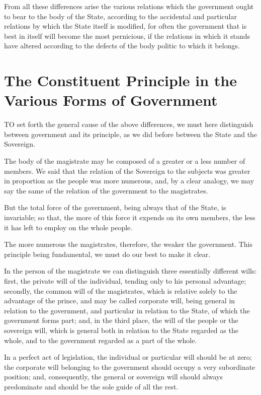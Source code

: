 \documentclass[12pt]{report}
\begin{document}
From all these differences arise the various relations which the government ought to bear to the body of the State, according to the accidental and particular relations by which the State itself is modified, for often the government that is best in itself will become the most pernicious, if the relations in which it stands have altered according to the defects of the body politic to which it belongs.

\section{The Constituent Principle in the Various Forms of Government}
TO set forth the general cause of the above differences, we must here distinguish between government and its principle, as we did before between the State and the Sovereign.

The body of the magistrate may be composed of a greater or a less number of members. We said that the relation of the Sovereign to the subjects was greater in proportion as the people was more numerous, and, by a clear analogy, we may say the same of the relation of the government to the magistrates.

But the total force of the government, being always that of the State, is invariable; so that, the more of this force it expends on its own members, the less it has left to employ on the whole people.

The more numerous the magistrates, therefore, the weaker the government. This principle being fundamental, we must do our best to make it clear.

In the person of the magistrate we can distinguish three essentially different wills: first, the private will of the individual, tending only to his personal advantage; secondly, the common will of the magistrates, which is relative solely to the advantage of the prince, and may be called corporate will, being general in relation to the government, and particular in relation to the State, of which the government forms part; and, in the third place, the will of the people or the sovereign will, which is general both in relation to the State regarded as the whole, and to the government regarded as a part of the whole.

In a perfect act of legislation, the individual or particular will should be at zero; the corporate will belonging to the government should occupy a very subordinate position; and, consequently, the general or sovereign will should always predominate and should be the sole guide of all the rest.
\end{document}
